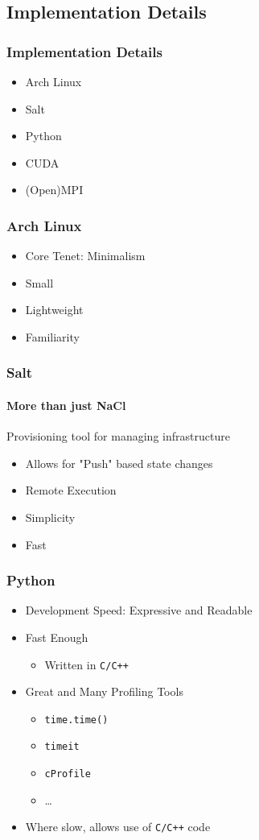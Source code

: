 \documentclass{beamer}
\begin{document}
\subsection{Implementation Details}
\begin{frame}
\frametitle{Implementation Details}
\begin{itemize}
\item{Arch Linux}
\item{Salt}
\item{Python}
\item{CUDA}
\item{(Open)MPI}
\end{itemize}
\end{frame}
\begin{frame}
\frametitle{Arch Linux}
\begin{itemize}
\item{Core Tenet: Minimalism}
\item{Small}
\item{Lightweight}
\item{Familiarity}
\end{itemize}
\end{frame}
\begin{frame}
\frametitle{Salt}
\framesubtitle{More than just NaCl}
Provisioning tool for managing infrastructure
\begin{itemize}
\item{Allows for "Push" based state changes}
\item{Remote Execution}
\item{Simplicity}
\item{Fast}
\end{itemize}
\end{frame}
\begin{frame}
\frametitle{Python}
\begin{itemize}
\item{Development Speed: Expressive and Readable}
\item{Fast Enough}
\begin{itemize}
\item{Written in \texttt{C/C++}}
\end{itemize}
\item{Great and Many Profiling Tools}
\begin{itemize}
\item{\texttt{time.time()}}
\item{\texttt{timeit}}
\item{\texttt{cProfile}}
\item{\dots{}}
\end{itemize}
\item{Where slow, allows use of \texttt{C/C++} code}
\end{itemize}
\end{frame}
\end{document}
